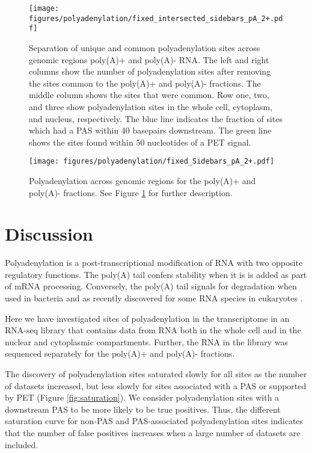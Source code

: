 \begin{figure}[h]
	\begin{center}
		\texttt{[image: figures/polyadenylation/fixed\_intersected\_sidebars\_pA\_2+.pdf]}
	\end{center}
    \caption{Separation of unique and common polyadenylation sites across
    genomic regions poly(A)+ and poly(A)- RNA. The left and right columns show
    the number of polyadenylation sites after removing the sites common to
	the poly(A)+ and poly(A)- fractions. The middle column shows the sites that
	were common. Row one, two, and three show polyadenylation sites in the whole
	cell, cytoplasm, and nucleus, respectively. The blue line indicates the
	fraction of sites which had a PAS within 40 basepairs downstream. The green
	line shows the sites found within 50 nucleotides of a PET signal.}
	\label{fig:sidebars_intersect}
\end{figure}

\begin{figure}[h]
	\begin{center}
		\texttt{[image: figures/polyadenylation/fixed\_Sidebars\_pA\_2+.pdf]}
	\end{center}
	\caption{Polyadenylation across genomic regions for the poly(A)+ and poly(A)-
	fractions. See Figure \ref{fig:sidebars_intersect} for further description.}
	\label{fig:sidebars}
\end{figure}

\section{Discussion}
Polyadenylation is a post-transcriptional modification of RNA with two opposite
regulatory functions. The poly(A) tail confers stability when it is is added as
part of mRNA processing. Conversely, the poly(A) tail signals for degradation
when used in bacteria and as recently discovered for some RNA species in
eukaryotes \cite{shcherbik_polyadenylation_2010}.

Here we have investigated sites of polyadenylation in the transcriptome in an
RNA-seq library that contains data from RNA both in the whole cell and in the
nuclear and cytoplasmic compartments. Further, the RNA in the library was
sequenced separately for the poly(A)+ and poly(A)- fractions.

The discovery of polyadenylation sites saturated slowly for all sites as the
number of datasets increased, but less slowly for sites associated with a PAS
or supported by PET (Figure \ref{fig:saturation}). We consider polyadenylation
sites with a downstream PAS to be more likely to be true positives. Thus, the
different saturation curve for non-PAS and PAS-associated polyadenylation sites
indicates that the number of false positives increases when a large number of
datasets are included.

